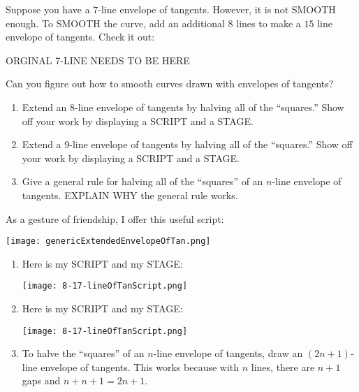 \documentclass[noauthor,nooutcomes,hints,handout]{ximera}
\begin{document}
\begin{question}
  Suppose you have a $7$-line envelope of tangents. However, it is not
  SMOOTH enough. To SMOOTH the curve, add an additional $8$ lines to
  make a $15$ line envelope of tangents. Check it out:
  \begin{center}
  ORGINAL 7-LINE NEEDS TO BE HERE  
  \end{center}
  Can you figure out how to smooth curves drawn with envelopes of
  tangents?
  \begin{enumerate}
    \item Extend an $8$-line envelope of tangents by halving all of
      the ``squares.''  Show off your work by displaying a SCRIPT and
      a STAGE.
    \item Extend a $9$-line envelope of tangents by halving all of the
      ``squares.''  Show off your work by displaying a SCRIPT and a
      STAGE.
    \item Give a general rule for halving all of the ``squares'' of an
      $n$-line envelope of tangents. EXPLAIN WHY the general rule works.
  \end{enumerate}
  As a gesture of friendship, I offer this useful script:
  \begin{center}
    \texttt{[image: genericExtendedEnvelopeOfTan.png]}
  \end{center}
  \begin{freeResponse}
    \begin{enumerate}
    \item Here is my SCRIPT and my STAGE:
      \begin{center}
        \texttt{[image: 8-17-lineOfTanScript.png]}\qquad{}
      \end{center}
    \item Here is my SCRIPT and my STAGE:
      \begin{center}
        \texttt{[image: 8-17-lineOfTanScript.png]}\qquad{}
      \end{center}
    \item To halve the ``squares'' of an $n$-line envelope of
      tangents, draw an $(2n+1)$-line envelope of tangents. This works
      because with $n$ lines, there are $n+1$ gaps and $n + n+1 =
      2n+1$.
    \end{enumerate}
  \end{freeResponse}
\end{question}
\end{document}
